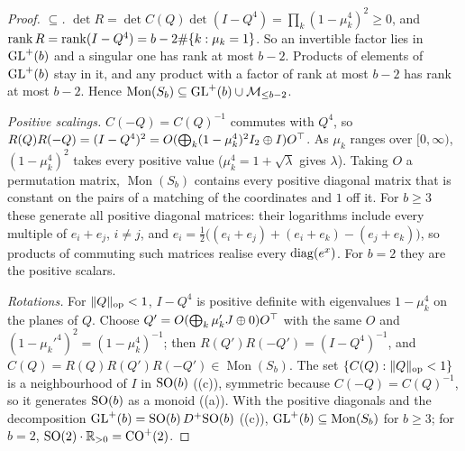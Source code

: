 \begin{proof}
\emph{$\subseteq$.} $\det R=\det C(Q)\det(I-Q^4)=\prod_k(1-\mu_k^4)^2\ge0$, and $\operatorname{rank} R=\operatorname{rank}(I-Q^4)=b-2\#\{k:\mu_k=1\}$. So an
invertible factor lies in $\mathrm{GL}^+(b)$ and a singular one has rank at most $b-2$. Products of elements of $\mathrm{GL}^+(b)$ stay in
it, and any product with a factor of rank at most $b-2$ has rank at most $b-2$. Hence $\operatorname{Mon}(S_b)\subseteq\mathrm{GL}^+
(b)\cup\mathcal{M}_{\le b-2}$.

\emph{Positive scalings.} $C(-Q)=C(Q)^{-1}$ commutes with $Q^4$, so $R(Q)R(-Q)=(I-Q^4)^2=O(\bigoplus_k(1-\mu_k^4)^2I_2\oplus
I)O^{\top}$. As $\mu_k$ ranges over $[0,\infty)$, $(1-\mu_k^4)^2$ takes every positive value ($\mu_k^4=1+\sqrt\lambda$ gives
$\lambda$). Taking $O$ a permutation matrix, $\operatorname{Mon}(S_b)$ contains every positive diagonal matrix that is
constant on the pairs of a matching of the coordinates and $1$ off it. For $b\ge3$ these generate all positive diagonal
matrices: their logarithms include every multiple of $e_i+e_j$, $i\ne j$, and $e_i=\tfrac12\big((e_i+e_j)+(e_i+e_k)-(e_j+
e_k)\big)$, so products of commuting such matrices realise every $\operatorname{diag}(e^x)$. For $b=2$ they are the positive scalars.

\emph{Rotations.} For $\lVert Q\rVert_{\rm op}<1$, $I-Q^4$ is positive definite with eigenvalues $1-\mu_k^4$ on the planes
of $Q$. Choose $Q'=O(\bigoplus_k\mu_k'J\oplus0)O^{\top}$ with the same $O$ and $(1-\mu_k'^4)^2=(1-\mu_k^4)^{-1}$; then
$R(Q')R(-Q')=(I-Q^4)^{-1}$, and $C(Q)=R(Q)R(Q')R(-Q')\in\operatorname{Mon}(S_b)$. The set $\{C(Q):\lVert Q\rVert_{\rm op}<1\}$
is a neighbourhood of $I$ in $\mathrm{SO}(b)$ ((c)), symmetric because $C(-Q)=C(Q)^{-1}$, so it generates $\mathrm{SO}(b)$ as a
monoid ((a)). With the positive diagonals and the decomposition $\mathrm{GL}^+(b)=\mathrm{SO}(b)\,D^+\mathrm{SO}(b)$
((c)), $\mathrm{GL}^+(b)\subseteq\operatorname{Mon}(S_b)$ for $b\ge3$; for $b=2$, $\mathrm{SO}(2)\cdot\mathbb{R}_{>0}=\mathrm{CO}^+(2)$.


\end{proof}
